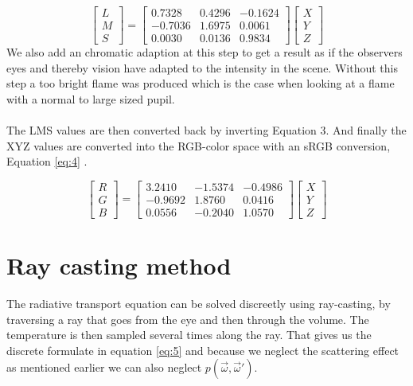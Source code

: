 \begin{equation}
\label{eq:3}
	\begin{bmatrix}
       L          \\
       M \\
       S
     \end{bmatrix} =
 	\begin{bmatrix}
       0.7328 & 0.4296 & -0.1624 \\
     -0.7036 & 1.6975 &  0.0061 \\
0.0030 & 0.0136 & 0.9834
     \end{bmatrix}
\begin{bmatrix}
      X          \\
       Y \\
       Z
     \end{bmatrix}
\end{equation}
We also add an chromatic adaption at this step to get a result as if the observers eyes and thereby vision have adapted to the intensity in the scene. Without this step a too bright flame was produced which is the case when looking at a flame with a normal to large sized pupil. \\\\
The LMS values are then converted back by inverting Equation 3. And finally the XYZ values are converted into the RGB-color space with an sRGB conversion, Equation \ref{eq:4} \cite{sRGB}.

\begin{equation}
\label{eq:4}
	\begin{bmatrix}
      R          \\
       G \\
       B
     \end{bmatrix} =
 	\begin{bmatrix}
      3.2410	& -1.5374	&  -0.4986 \\
	 -0.9692 & 1.8760	&  0.0416 \\
	 0.0556 & -0.2040	& 1.0570
     \end{bmatrix}
\begin{bmatrix}
      X          \\
       Y \\
       Z
     \end{bmatrix}
\end{equation}

\section{Ray casting method}
The radiative transport equation can be solved discreetly using ray-casting, by traversing a ray that goes from the eye and then through the volume. The temperature is then sampled several times along the ray. That gives us the discrete formulate in equation \ref{eq:5} \cite{Nguyen02} and because we neglect the scattering effect as mentioned earlier we can also neglect $ p(\vec{\omega},\vec{\omega}')$.

